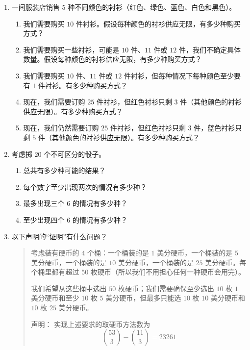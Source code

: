 \begin{enumerate}[label=(\arabic*)]
    \item 一间服装店销售 $5$ 种不同颜色的衬衫（红色、绿色、蓝色、白色和黑色）。
          \begin{enumerate}[label=(\alph*)]
              \item 我们需要购买 $10$ 件衬衫。假设每种颜色的衬衫供应无限，有多少种购买方式？
              \item 我们需要购买一些衬衫，可能是 $10$ 件、$11$ 件或 $12$ 件，我们不确定具体数量。假设每种颜色的衬衫供应无限，有多少种购买方式？
              \item 我们需要购买 $10$ 件、$11$ 件或 $12$ 件衬衫，但每种情况下每种颜色至少要有 $1$ 件衬衫。有多少种购买方式？
              \item 现在，我们需要订购 $25$ 件衬衫，但红色衬衫只剩 $3$ 件（其他颜色的衬衫供应无限）。有多少种购买方式？
              \item 现在，我们仍然需要订购 $25$ 件衬衫，但红色衬衫只剩 $3$ 件，蓝色衬衫只剩 $5$ 件（其他颜色的衬衫供应无限）。有多少种购买方式？
          \end{enumerate}
    \item 考虑掷 $20$ 个不可区分的骰子。
          \begin{enumerate}[label=(\alph*)]
              \item 总共有多少种可能的结果？
              \item 每个数字至少出现两次的情况有多少种？
              \item 最多出现三个 $6$ 的情况有多少种？
              \item 至少出现四个 $6$ 的情况有多少种？
          \end{enumerate}
    \item 以下声明的``证明''有什么问题？
          \begin{quotation}
              考虑装有硬币的 $4$ 个桶：一个桶装的是 $1$ 美分硬币，一个桶装的是 $5$ 美分硬币，一个桶装的是 $10$ 美分硬币，一个桶装的是 $25$ 美分硬币。每个桶里都有超过 $50$ 枚硬币（所以我们不用担心任何一种硬币会用完）。

              我们希望从这些桶中选出 $50$ 枚硬币；我们需要确保至少选出 $10$ 枚 $1$ 美分硬币和至少 $10$ 枚 $5$ 美分硬币，但最多只能选 $10$ 枚 $10$ 美分硬币和 $10$ 枚 $25$ 美分硬币。

              \begin{questions}{声明：}
                  实现上述要求的取硬币方法数为
                  \[{53 \choose 3}-{11 \choose 3}=23261\]
              \end{questions}


\end{quotation}
\end{enumerate}
